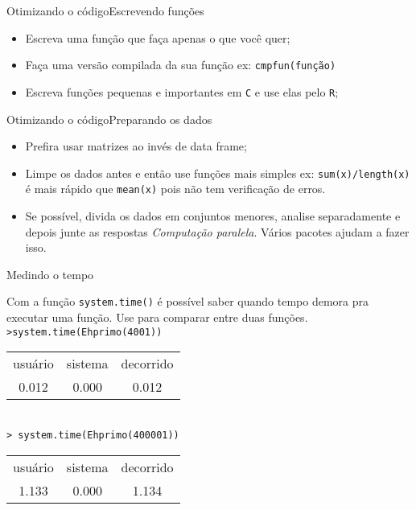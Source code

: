 \documentclass[handout]{beamer}
\begin{document}
\begin{frame}{Otimizando o código}{Escrevendo funções}
  \begin{itemize}[<+->]
  \item Escreva uma função que faça apenas o que você quer;
  \item Faça uma versão compilada da sua função ex: \texttt{cmpfun(função)}
   \item Escreva funções  pequenas e importantes em \texttt{C} e use elas pelo \texttt{R};
 
  
  \end{itemize}
  
\end{frame}

\begin{frame}{Otimizando o código}{Preparando os dados}
  \begin{itemize}
   \item Prefira usar matrizes ao invés de  data frame;
     \item Limpe os dados antes e então use funções mais simples ex: \texttt{sum(x)/length(x)} é mais rápido que \texttt{mean(x)} pois não tem verificação de erros.
\item Se possível, divida os dados em conjuntos menores, analise separadamente e depois junte as respostas \textit{Computação paralela}. Vários pacotes ajudam a fazer isso.
  \end{itemize}
 
\end{frame}

\begin{frame}{Medindo o tempo}

Com a função \texttt{system.time()} é possível saber quando tempo demora pra executar uma função. Use para comparar entre duas funções.\\


\texttt{>system.time(Ehprimo(4001))}\\
 \begin{tabular}{c c c}
  usuário &  sistema &decorrido \\
    0.012  &   0.000 &    0.012\\
  \end{tabular}\\ \pause
\texttt{>  system.time(Ehprimo(400001))}\\
  \begin{tabular}{c c c}
  usuário &  sistema &decorrido \\
    1.133  &   0.000 &    1.134\\
  \end{tabular}\\


  
\end{frame}
\end{document}

